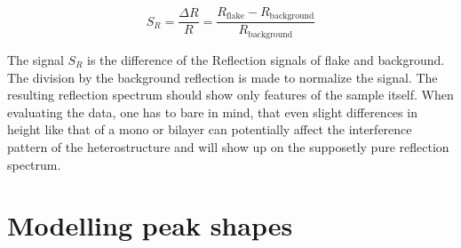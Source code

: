\[ 
	S_R = \frac{\Delta R}{R} = \frac{R_{\mathrm{flake}} - R_{\mathrm{background}}}{R_{\mathrm{background}}}
\]

The signal $S_R$ is the difference of the Reflection signals of \tmdg flake and background. The division by the background reflection is made to normalize the signal. The resulting reflection spectrum should show only features of the sample itself. When evaluating the data, one has to bare in mind, that even slight differences in height like that of a mono or bilayer can potentially affect the interference pattern of the heterostructure and will show up on the supposetly pure reflection spectrum. 

\section{Modelling peak shapes}\label{fits}

